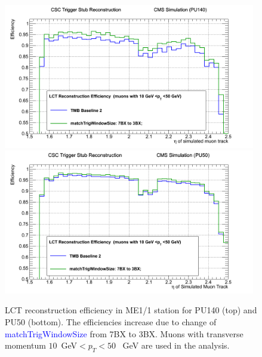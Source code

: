 \begin{figure} [h!]
\includegraphics[width=0.98\textwidth]{figures/PU140_Improv_from2_to_3.png}
\includegraphics[width=0.98\textwidth]{figures/PU50_Improv_from2_to_3.png}
\caption{LCT reconstruction efficiency in ME1/1 station for PU140 (top) and PU50 (bottom). The efficiencies increase due to change of \textcolor{blue}{matchTrigWindowSize} from 7BX to 3BX. Muons with transverse momentum $10$~GeV$<p_T<50$~ GeV are used in the analysis.}
\label{fig:From2to3}
\end{figure}
